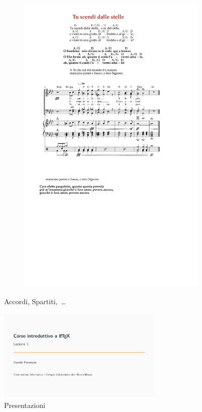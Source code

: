 \documentclass[a4paper,12pt]{article}
\newcommand{\1}{\ensuremath{\mathds{1}}}
\begin{document}
\begin{figure}[!h]
\begin{subfigure}[b]{0.6\textwidth}
        \includegraphics[width=\textwidth]{img/spartiti}
    \end{subfigure}
  \caption{Accordi, Spartiti,~\dots}
\end{figure}\vspace{100px}\newpage
\begin{figure}[!h]\centering
  \includegraphics[width=0.7\textwidth,page=1]{img/presentazione}
  \caption{Presentazioni}
\end{figure}
\end{document}

